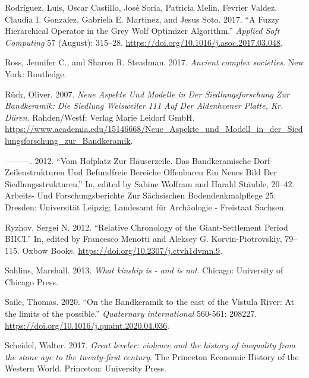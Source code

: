 \documentclass[
  12pt,
  a4paper, twoside]{book}
\newlength{\cslhangindent}
\newlength{\cslentryspacingunit} %
\newenvironment{CSLReferences}[2] %
 {%
  \setlength{\parindent}{0pt}
  \ifodd #1
  \let\oldpar\par
  \def\par{\hangindent=\cslhangindent\oldpar}
  \fi
  \setlength{\parskip}{#2\cslentryspacingunit}
 }%
 {}
\begin{document}
\begin{CSLReferences}{1}{0}
\leavevmode{}%
Rodríguez, Luis, Oscar Castillo, José Soria, Patricia Melin, Fevrier Valdez, Claudia I. Gonzalez, Gabriela E. Martinez, and Jesus Soto. 2017. {``A Fuzzy Hierarchical Operator in the Grey Wolf Optimizer Algorithm.''} \emph{Applied Soft Computing} 57 (August): 315--28. \url{https://doi.org/10.1016/j.asoc.2017.03.048}.

\leavevmode{}%
Ross, Jennifer C., and Sharon R. Steadman. 2017. \emph{Ancient complex societies}. New York: Routledge.

\leavevmode{}%
Rück, Oliver. 2007. \emph{Neue Aspekte Und Modelle in Der Siedlungsforschung Zur Bandkeramik: Die Siedlung Weisweiler 111 Auf Der Aldenhvener Platte, Kr. Düren}. Rahden/Westf: Verlag Marie Leidorf GmbH. \url{https://www.academia.edu/15146668/Neue_Aspekte_und_Modell_in_der_Siedlungsforschung_zur_Bandkeramik}.

\leavevmode{}%
---------. 2012. {``Vom Hofplatz Zur Häuserzeile. Das Bandkeramische Dorf-Zeilenstrukturen Und Befundfreie Bereiche Offenbaren Ein Neues Bild Der Siedlungsstrukturen.''} In, edited by Sabine Wolfram and Harald Stäuble, 20--42. Arbeits- Und Forschungsberichte Zur Sächsischen Bodendenkmalpflege 25. Dresden: Universität Leipzig; Landesamt für Archäologie - Freistaat Sachsen.

\leavevmode{}%
Ryzhov, Sergei N. 2012. {``Relative Chronology of the Giant-Settlement Period BII{\textendash}CI.''} In, edited by Francesco Menotti and Aleksey G. Korvin-Piotrovskiy, 79--115. Oxbow Books. \url{https://doi.org/10.2307/j.ctvh1dvmn.9}.

\leavevmode{}%
Sahlins, Marshall. 2013. \emph{What kinship is - and is not}. Chicago: University of Chicago Press.

\leavevmode{}%
Saile, Thomas. 2020. {``On the Bandkeramik to the east of the Vistula River: At the limits of the possible.''} \emph{Quaternary international} 560-561: 208227. \url{https://doi.org/10.1016/j.quaint.2020.04.036}.

\leavevmode{}%
Scheidel, Walter. 2017. \emph{Great leveler: violence and the history of inequality from the stone age to the twenty-first century}. The Princeton Economic History of the Western World. Princeton: University Press.


\end{CSLReferences}
\end{document}
